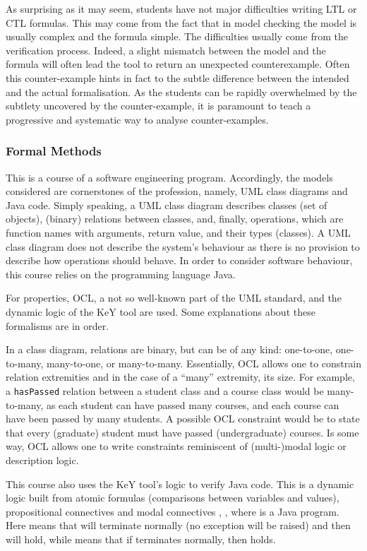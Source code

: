 \documentclass[a4paper,UKenglish]{lipics}
\begin{document}
As surprising as it may seem, students have not major difficulties writing LTL or CTL formulas. This may come from the fact that in model checking the model is usually complex and the formula simple. The difficulties usually come from the verification process. Indeed, a slight mismatch between the model and the formula will often lead the tool to return an unexpected counterexample. Often this counter-example hints in fact to the subtle difference between the intended and the actual formalisation. As the students can be rapidly overwhelmed by the subtlety uncovered by the counter-example, it is paramount to teach a progressive and systematic way to analyse counter-examples. 
\subsubsection{Formal Methods}\label{SECFM}
This is a course of a software engineering program. Accordingly, the models considered are cornerstones of the profession, namely, UML class diagrams and Java code. Simply speaking, a UML class diagram describes classes (set of objects), (binary) relations between classes, and, finally, operations, which are function names with arguments, return value, and their types (classes). A UML class diagram does not describe the system's behaviour as there is no provision to describe how operations should behave. In order to consider software behaviour, this course relies on the programming language Java.

For properties, OCL, a not so well-known part of the UML standard, and the dynamic logic of the KeY tool are used. Some explanations about these formalisms are in order.

In a class diagram, relations are binary, but can be of any kind: one-to-one, one-to-many, many-to-one, or many-to-many. Essentially, OCL allows one to constrain relation extremities and in the case of a ``many'' extremity, its size. For example, a \texttt{hasPassed} relation between a student class and a course class would be many-to-many, as each student can have passed many courses, and each course can have been passed by many students. A possible OCL constraint would be to state that every (graduate) student must have passed  (undergraduate) courses. Is some way, OCL allows one to write constraints reminiscent of (multi-)modal logic or description logic.

This course also uses the KeY tool's logic to verify Java code. This is a dynamic logic built from atomic formulas (comparisons between variables and values), propositional connectives and modal connectives , , where  is a Java program. Here  means that  will terminate normally (no exception will be raised) and then  will hold, while  means that if  terminates normally, then  holds.
\end{document}
